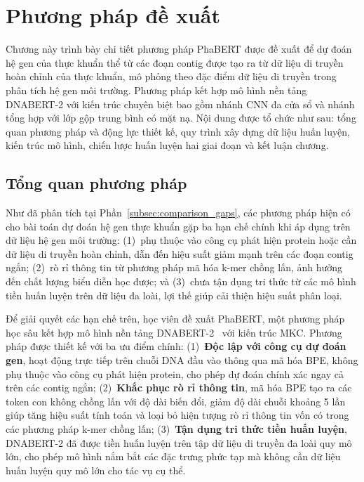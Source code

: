 \chapter{Phương pháp đề xuất}
\label{chap:method}

Chương này trình bày chi tiết phương pháp PhaBERT được đề xuất để dự đoán hệ gen của thực khuẩn thể từ các đoạn contig được tạo ra từ dữ liệu di truyền hoàn chỉnh của thực khuẩn, mô phỏng theo đặc điểm dữ liệu di truyền trong phân tích hệ gen môi trường. Phương pháp kết hợp mô hình nền tảng DNABERT-2 với kiến trúc chuyên biệt bao gồm nhánh CNN đa cửa sổ và nhánh tổng hợp với lớp gộp trung bình có mặt nạ. Nội dung được tổ chức như sau: tổng quan phương pháp và động lực thiết kế, quy trình xây dựng dữ liệu huấn luyện, kiến trúc mô hình, chiến lược huấn luyện hai giai đoạn và kết luận chương.

\section{Tổng quan phương pháp}
\label{sec:overview}

Như đã phân tích tại Phần~\ref{subsec:comparison_gaps}, các phương pháp hiện có cho bài toán dự đoán hệ gen thực khuẩn gặp ba hạn chế chính khi áp dụng trên dữ liệu hệ gen môi trường: (1)~phụ thuộc vào công cụ phát hiện protein hoặc cần dữ liệu di truyền hoàn chỉnh, dẫn đến hiệu suất giảm mạnh trên các đoạn contig ngắn; (2)~rò rỉ thông tin từ phương pháp mã hóa k-mer chồng lấn, ảnh hưởng đến chất lượng biểu diễn học được; và (3)~chưa tận dụng tri thức từ các mô hình tiền huấn luyện trên dữ liệu đa loài, lợi thế giúp cải thiện hiệu suất phân loại.

Để giải quyết các hạn chế trên, học viên đề xuất PhaBERT, một phương pháp học sâu kết hợp mô hình nền tảng DNABERT-2~\cite{zhou2023dnabert} với kiến trúc MKC. Phương pháp được thiết kế với ba ưu điểm chính:
(1)~\textbf{Độc lập với công cụ dự đoán gen}, hoạt động trực tiếp trên chuỗi DNA đầu vào thông qua mã hóa BPE, không phụ thuộc vào công cụ phát hiện protein, cho phép dự đoán chính xác ngay cả trên các contig ngắn;
(2)~\textbf{Khắc phục rò rỉ thông tin}, mã hóa BPE tạo ra các token con không chồng lấn với độ dài biến đổi, giảm độ dài chuỗi khoảng 5 lần giúp tăng hiệu suất tính toán và loại bỏ hiện tượng rò rỉ thông tin vốn có trong các phương pháp k-mer chồng lấn;
(3)~\textbf{Tận dụng tri thức tiền huấn luyện}, DNABERT-2 đã được tiền huấn luyện trên tập dữ liệu di truyền đa loài quy mô lớn, cho phép mô hình nắm bắt các đặc trưng phức tạp mà không cần dữ liệu huấn luyện quy mô lớn cho tác vụ cụ thể.

